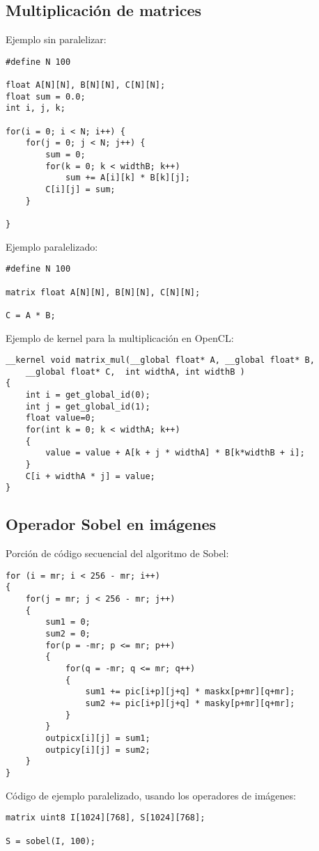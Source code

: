 \documentclass[12pt,a4paper]{article}
\begin{document}
\subsection
{Multiplicación de matrices}
Ejemplo sin paralelizar:
\begin{lstlisting}
#define N 100

float A[N][N], B[N][N], C[N][N];
float sum = 0.0;
int i, j, k;

for(i = 0; i < N; i++) {
    for(j = 0; j < N; j++) {
        sum = 0;
        for(k = 0; k < widthB; k++)
            sum += A[i][k] * B[k][j];
        C[i][j] = sum;
    }

}
\end{lstlisting}

Ejemplo paralelizado:
\begin{lstlisting}
#define N 100

matrix float A[N][N], B[N][N], C[N][N];

C = A * B;
\end{lstlisting}

Ejemplo de kernel para la multiplicación en OpenCL:
\begin{lstlisting}
__kernel void matrix_mul(__global float* A, __global float* B, 
	__global float* C,  int widthA, int widthB )
{
    int i = get_global_id(0);
    int j = get_global_id(1);
    float value=0;
    for(int k = 0; k < widthA; k++)
    {
        value = value + A[k + j * widthA] * B[k*widthB + i];
    }
    C[i + widthA * j] = value;
}
\end{lstlisting}


\subsection
{Operador Sobel en imágenes}

Porción de código secuencial del algoritmo de Sobel:
\begin{lstlisting}
for (i = mr; i < 256 - mr; i++)
{
    for(j = mr; j < 256 - mr; j++)
    {
        sum1 = 0;
        sum2 = 0;
        for(p = -mr; p <= mr; p++)
        {
            for(q = -mr; q <= mr; q++)
            {
                sum1 += pic[i+p][j+q] * maskx[p+mr][q+mr];
                sum2 += pic[i+p][j+q] * masky[p+mr][q+mr];
            }
        }
        outpicx[i][j] = sum1;
        outpicy[i][j] = sum2;
    }
}
\end{lstlisting}

Código de ejemplo paralelizado, usando los operadores de imágenes:
\begin{lstlisting}
matrix uint8 I[1024][768], S[1024][768];

S = sobel(I, 100);
\end{lstlisting}
\end{document}
